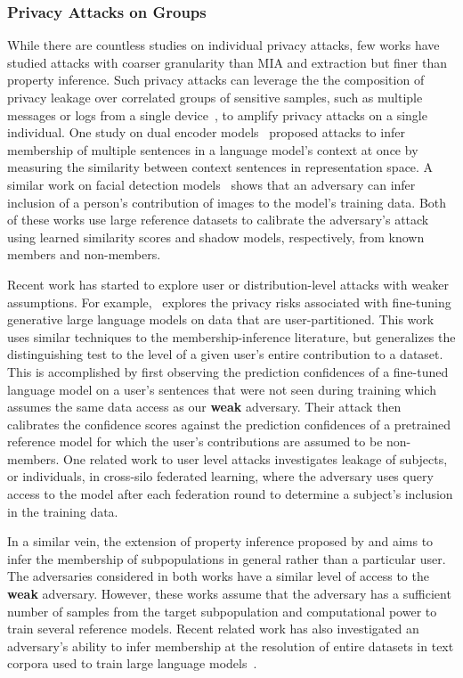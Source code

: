 \subsubsection{Privacy Attacks on Groups} 
While there are countless studies on individual privacy attacks, few works have studied attacks with coarser granularity than MIA and extraction but finer than property inference. Such privacy attacks can leverage the the composition of privacy leakage over correlated groups of sensitive samples, such as multiple messages or logs from a single device~\cite{mcmahan-2018-learningdplm}, to amplify privacy attacks on a single individual. One study on dual encoder models~\cite{song-2020-embeddingleakage} proposed attacks to infer membership of multiple sentences in a language model's context at once by measuring the similarity between context sentences in representation space. A similar work on facial detection models~\cite{chen2023faceauditor} shows that an adversary can infer inclusion of a person's contribution of images to the model's training data. Both of these works use large reference datasets to calibrate the adversary's attack using learned similarity scores and shadow models, respectively, from known members and non-members.

Recent work has started to explore user or distribution-level attacks with weaker assumptions. For example,~\cite{kandpal2023userinference} explores the privacy risks associated with fine-tuning generative large language models on data that are user-partitioned. This work uses similar techniques to the membership-inference literature, but generalizes the distinguishing test to the level of a given user's entire contribution to a dataset. This is accomplished by first observing the prediction confidences of a fine-tuned language model on a user's sentences that were not seen during training which assumes the same data access as our \textbf{weak} adversary. Their attack then calibrates the confidence scores against the prediction confidences of a pretrained reference model for which the user's contributions are assumed to be non-members. One related work to user level attacks \cite{suri2023subjectmembershipinferenceattacks} investigates leakage of subjects, or individuals, in cross-silo federated learning, where the adversary uses query access to the model after each federation round to determine a subject's inclusion in the training data.  

In a similar vein, the extension of property inference proposed by \cite{chaudhari-2022-snap} and \cite{hartmann-2023-distributioninference} aims to infer the membership of subpopulations in general rather than a particular user. The adversaries considered in both works have a similar level of access to the \textbf{weak} adversary. However, these works assume that the adversary has a sufficient number of samples from the target subpopulation and computational power to train several reference models. Recent related work has also investigated an adversary's ability to infer membership at the resolution of entire datasets in text corpora used to train large language models~\cite{maini-2024-datasetinference, ren-2025-datasetself}.




